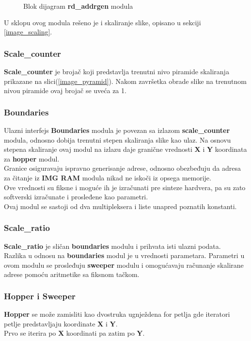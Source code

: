 \begin{figure}[H]
    
\caption{Blok dijagram \textbf{rd\_addrgen} modula}
\label{rd_addrgen_bd}
\end{figure}

U sklopu ovog modula rešeno je i skaliranje slike, opisano u sekciji \ref{image_scaling}.

\subsubsection{Scale\_counter}\label{scale_counter_sec}
\textbf{Scale\_counter} je brojač koji predstavlja trenutni nivo piramide
skaliranja prikazane na slici(\ref{image_pyramid}).
Nakom završetka obrade slike na trenutnom nivou piramide ovaj brojač se uveća za
1. \\

\subsubsection{Boundaries}\label{boundaries_sec}
Ulazni interfejs \textbf{Boundaries} modula je povezan sa izlazom
\textbf{scale\_counter} modula, odnosno dobija trenutni stepen skaliranja slike kao ulaz.
Na osnovu stepena skaliranje ovaj modul na izlazu daje granične vrednosti
\textbf{X} i \textbf{Y} koordinata za \textbf{hopper} modul.\\
Granice osiguravaju ispravno generisanje adrese, odnosno obezbeđuju da
adresa za čitanje iz \textbf{IMG RAM} modula nikad ne iskoči iz opsega memorije. \\
Ove vrednosti su fiksne i moguće ih je izračunati pre sinteze hardvera, pa su
zato softverski izračunate i prosleđene kao parametri. \\
Ovaj modul se sastoji od dva multipleksera i liste unapred poznatih konstanti.

\subsubsection{Scale\_ratio}\label{scale_ratio_sec}

\textbf{Scale\_ratio} je sličan \textbf{boundaries} modulu i prihvata isti
ulazni podata. \\
Razlika u odnosu na \textbf{boundaries} modul je u vrednosti parametara.
Parametri u ovom modulu se prosleđuju \textbf{sweeper} modulu i omogućavaju
računanje skalirane adrese pomoću aritmetike sa fiksnom tačkom.

\subsubsection{Hopper i Sweeper}\label{hopper_sec}
\textbf{Hopper} se može zamisliti kao dvostruka ugnježdena for petlja gde
iteratori petlje predstavljaju koordinate \textbf{X} i \textbf{Y}. \\
Prvo se iterira po \textbf{X} koordinati pa zatim po \textbf{Y}.

